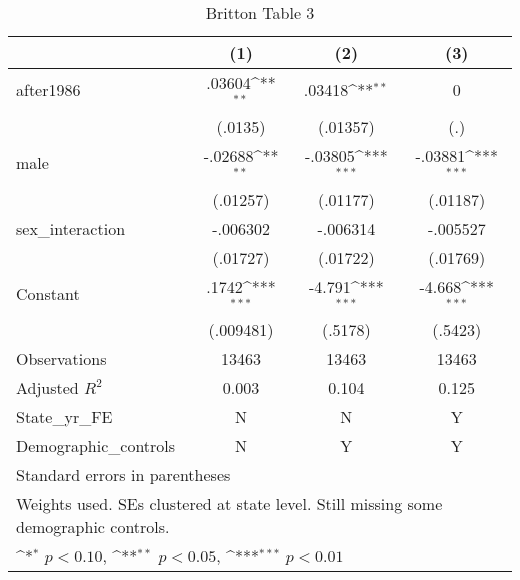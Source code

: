 \begin{table}[htbp]\centering
\def\sym#1{\ifmmode^{#1}\else\(^{#1}\)\fi}
\caption{Britton Table 3}
\begin{tabular}{l*{3}{c}}
\hline\hline
                    &\multicolumn{1}{c}{(1)}         &\multicolumn{1}{c}{(2)}         &\multicolumn{1}{c}{(3)}         \\
\hline
after1986           &      .03604\sym{**} &      .03418\sym{**} &           0         \\
                    &     (.0135)         &    (.01357)         &         (.)         \\
[1em]
male                &     -.02688\sym{**} &     -.03805\sym{***}&     -.03881\sym{***}\\
                    &    (.01257)         &    (.01177)         &    (.01187)         \\
[1em]
sex\_interaction     &    -.006302         &    -.006314         &    -.005527         \\
                    &    (.01727)         &    (.01722)         &    (.01769)         \\
[1em]
Constant            &       .1742\sym{***}&      -4.791\sym{***}&      -4.668\sym{***}\\
                    &   (.009481)         &     (.5178)         &     (.5423)         \\
\hline
Observations        &       13463         &       13463         &       13463         \\
Adjusted \(R^{2}\)  &       0.003         &       0.104         &       0.125         \\
State\_yr\_FE         &           N         &           N         &           Y         \\
Demographic\_controls&           N         &           Y         &           Y         \\
\hline\hline
\multicolumn{4}{l}{\footnotesize Standard errors in parentheses}\\
\multicolumn{4}{l}{\footnotesize Weights used. SEs clustered at state level. Still missing some demographic controls.}\\
\multicolumn{4}{l}{\footnotesize \sym{*} \(p<0.10\), \sym{**} \(p<0.05\), \sym{***} \(p<0.01\)}\\
\end{tabular}
\end{table}
